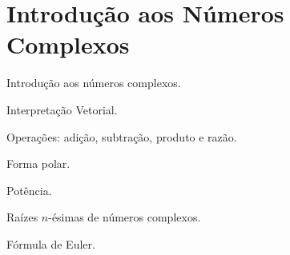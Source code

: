 \chapter{Introdução aos Números Complexos}

Introdução aos números complexos.

Interpretação Vetorial.

Operações: adição, subtração, produto e razão.

Forma polar.

Potência.

Raízes $n$-ésimas de números complexos.

Fórmula de Euler.

